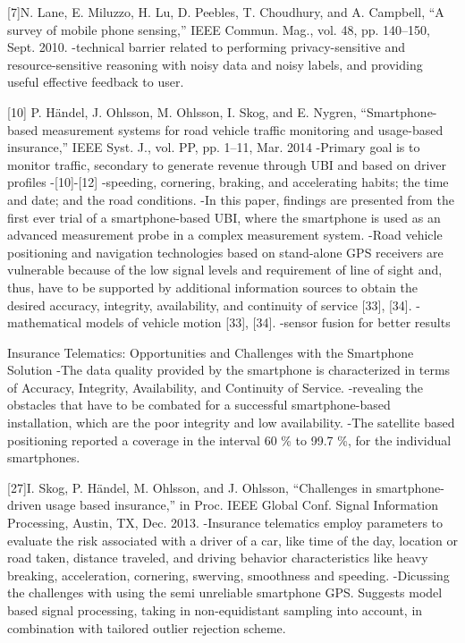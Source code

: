 [7]N. Lane, E. Miluzzo, H. Lu, D. Peebles, T. Choudhury, and A. Campbell, “A survey of mobile phone sensing,” IEEE Commun. Mag., vol. 48, pp. 140–150, Sept. 2010.
-technical barrier related to performing privacy-sensitive and resource-sensitive reasoning with noisy data and noisy labels, and providing useful effective feedback to user.


[10] P. Händel, J. Ohlsson, M. Ohlsson, I. Skog, and E. Nygren, “Smartphone-based measurement systems for road vehicle traffic monitoring and usage-based insurance,” IEEE Syst. J., vol. PP, pp. 1–11, Mar. 2014
-Primary goal is to monitor traffic, secondary to generate revenue through UBI and based on driver profiles
-[10]-[12]
-speeding, cornering, braking, and accelerating habits; the time and date; and the road conditions.
-In this paper, findings are presented from the first ever trial of a smartphone-based UBI, where the smartphone is used as an advanced measurement probe in a complex measurement system.
-Road vehicle positioning and navigation technologies based on stand-alone GPS receivers are vulnerable because of the low signal levels and requirement of line of sight and, thus, have to be supported by additional information sources to obtain the desired accuracy, integrity, availability, and continuity of service [33], [34].
-mathematical models of vehicle motion [33], [34].
-sensor fusion for better results


Insurance Telematics: Opportunities and Challenges with the Smartphone Solution
-The data quality provided by the smartphone is characterized in terms of Accuracy, Integrity, Availability, and Continuity of Service.
-revealing the obstacles that have to be combated for a successful smartphone-based installation, which are the poor integrity and low availability.
-The satellite based positioning reported a coverage in the interval 60 \% to 99.7 \%, for the individual smartphones.

[27]I. Skog, P. Händel, M. Ohlsson, and J. Ohlsson, “Challenges in smartphone-driven usage based insurance,” in Proc. IEEE Global Conf. Signal Information Processing, Austin, TX, Dec. 2013.
-Insurance telematics employ parameters to evaluate the risk associated with a driver of a car, like time of the day, location or road taken, distance traveled, and driving behavior characteristics like heavy breaking, acceleration, cornering, swerving, smoothness and speeding.
-Dicussing the challenges with using the semi unreliable smartphone GPS. Suggests model based signal processing, taking in non-equidistant sampling into account, in combination with tailored outlier rejection scheme.


